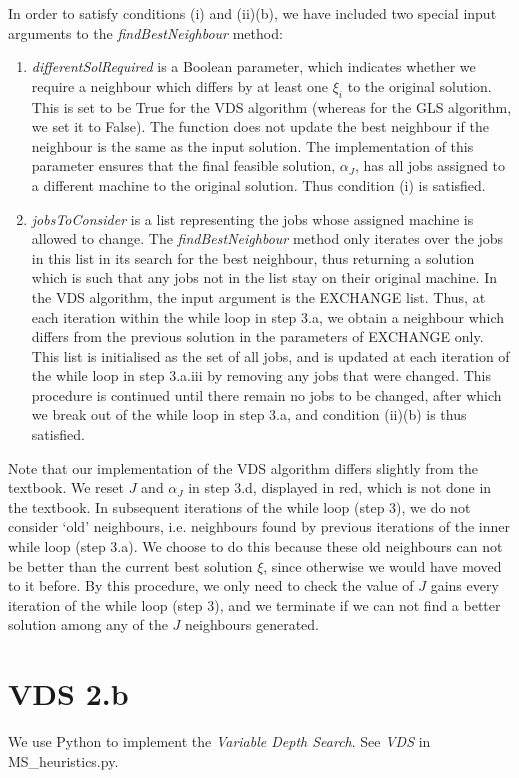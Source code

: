 \documentclass[12pt,a4paper,reqno]{article}
\begin{document}
In order to satisfy conditions (i) and (ii)(b), we have included two special input arguments to the \textit{findBestNeighbour} method:
\begin{enumerate}
\item \textit{differentSolRequired} is a Boolean parameter, which indicates whether we require a neighbour which differs by at least one $\xi_i$ to the original solution. This is set to be True for the VDS algorithm (whereas for the GLS algorithm, we set it to False). The function does not update the best neighbour if the neighbour is the same as the input solution. The implementation of this parameter ensures that the final feasible solution, $\alpha_J$, has all jobs assigned to a different machine to the original solution. Thus condition (i) is satisfied.
\item \textit{jobsToConsider} is a list representing the jobs whose assigned machine is allowed to change. The \textit{findBestNeighbour} method only iterates over the jobs in this list in its search for the best neighbour, thus returning a solution which is such that any jobs not in the list stay on their original machine. In the VDS algorithm, the input argument is the EXCHANGE list. Thus, at each iteration within the while loop in step 3.a, we obtain a neighbour which differs from the previous solution in the parameters of EXCHANGE only. This list is initialised as the set of all jobs, and is updated at each iteration of the while loop in step 3.a.iii by removing any jobs that were changed. This procedure is continued until there remain no jobs to be changed, after which we break out of the while loop in step 3.a, and condition (ii)(b) is thus satisfied.
\end{enumerate}

Note that our implementation of the VDS algorithm differs slightly from the textbook. We reset $J$ and $\alpha_J$ in step 3.d, displayed in red, which is not done in the textbook. In subsequent iterations of the while loop (step 3), we do not consider `old' neighbours, i.e. neighbours found by previous iterations of the inner while loop (step 3.a). We choose to do this because these old neighbours can not be better than the current best solution $\xi$, since otherwise we would have moved to it before. By this procedure, we only need to check the value of $J$ gains every iteration of the while loop (step 3), and we terminate if we can not find a better solution among any of the $J$ neighbours generated.

\section*{VDS 2.b}
We use Python to implement the \emph{Variable Depth Search}. See \emph{VDS} in MS\_heuristics.py.
\end{document}
